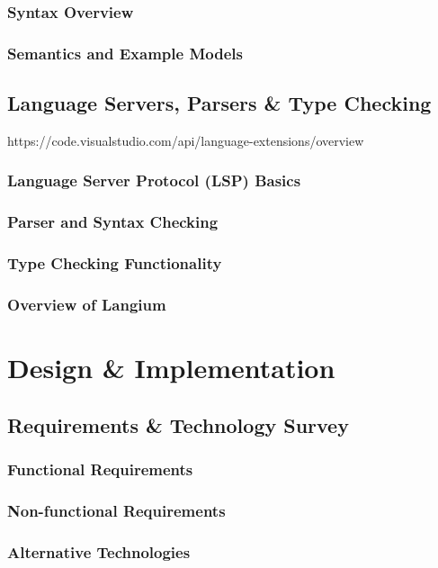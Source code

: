 \documentclass[11pt]{report}
\begin{document}
\section{Syntax Overview}
\section{Semantics and Example Models}

\chapter{Language Servers, Parsers \& Type Checking}
https://code.visualstudio.com/api/language-extensions/overview
\section{Language Server Protocol (LSP) Basics}
\section{Parser and Syntax Checking}
\section{Type Checking Functionality}
\section{Overview of Langium}

\part{Design \& Implementation}

\chapter{Requirements \& Technology Survey}
\section{Functional Requirements}
\section{Non-functional Requirements}
\section{Alternative Technologies}
\end{document}
